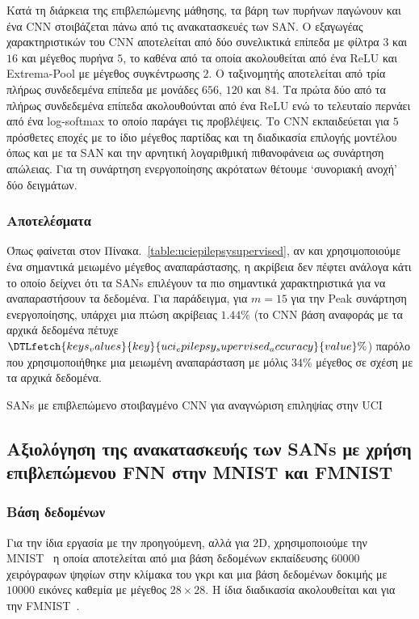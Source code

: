 Κατά τη διάρκεια της επιβλεπώμενης μάθησης, τα βάρη των πυρήνων παγώνουν και ένα CNN στοιβάζεται πάνω από τις ανακατασκευές των SAN\@.
Ο εξαγωγέας χαρακτηριστικών του CNN αποτελείται από δύο συνελικτικά επίπεδα με φίλτρα $3$ και $16$ και μέγεθος πυρήνα $5$, το καθένα από τα οποία ακολουθείται από ένα ReLU και Extrema-Pool με μέγεθος συγκέντρωσης $2$.
Ο ταξινομητής αποτελείται από τρία πλήρως συνδεδεμένα επίπεδα με μονάδες $656$, $120$ και $84$.
Τα πρώτα δύο από τα πλήρως συνδεδεμένα επίπεδα ακολουθούνται από ένα ReLU ενώ το τελευταίο περνάει από ένα log-softmax το οποίο παράγει τις προβλέψεις.
Το CNN εκπαιδεύεται για $5$ πρόσθετες εποχές με το ίδιο μέγεθος παρτίδας και τη διαδικασία επιλογής μοντέλου όπως και με τα SAN και την αρνητική λογαριθμική πιθανοφάνεια ως συνάρτηση απώλειας.
Για τη συνάρτηση ενεργοποίησης ακρότατων θέτουμε `συνοριακή ανοχή' δύο δειγμάτων.

\subsubsection{Αποτελέσματα}
Όπως φαίνεται στον Πίνακα.~\ref{table:uciepilepsysupervised}, αν και χρησιμοποιούμε ένα σημαντικά μειωμένο μέγεθος αναπαράστασης, η ακρίβεια δεν πέφτει ανάλογα κάτι το οποίο δείχνει ότι τα SANs επιλέγουν τα πιο σημαντικά χαρακτηριστικά για να αναπαραστήσουν τα δεδομένα.
Για παράδειγμα, για $m = 15$ για την Peak συνάρτηση ενεργοποίησης, υπάρχει μια πτώση ακρίβειας $1.44\%$ (το CNN βάση αναφοράς με τα αρχικά δεδομένα πέτυχε $\DTLfetch{keys_values}{key}{uci_epilepsy_supervised_accuracy}{value}\%$) παρόλο που χρησιμοποιήθηκε μια μειωμένη αναπαράσταση με μόλις $34\%$ μέγεθος σε σχέση με τα αρχικά δεδομένα.

\begin{table}
	\centering
	\caption{SANs με επιβλεπώμενο στοιβαγμένο CNN για αναγνώριση επιληψίας στην UCI}
	\label{table:uciepilepsysupervised}
	
\end{table}

\subsection{Αξιολόγηση της ανακατασκευής των SANs με χρήση επιβλεπώμενου FNN στην MNIST και FMNIST}
\subsubsection{Βάση δεδομένων}
Για την ίδια εργασία με την προηγούμενη, αλλά για 2D, χρησιμοποιούμε την MNIST~\cite{lecun1998gradient} η οποία αποτελείται από μια βάση δεδομένων εκπαίδευσης $60000$ χειρόγραφων ψηφίων στην κλίμακα του γκρι και μια βάση δεδομένων δοκιμής με $10000$ εικόνες καθεμία με μέγεθος $28\times 28$.
Η ίδια διαδικασία ακολουθείται και για την FMNIST~\cite{xiao2017fashion}.

